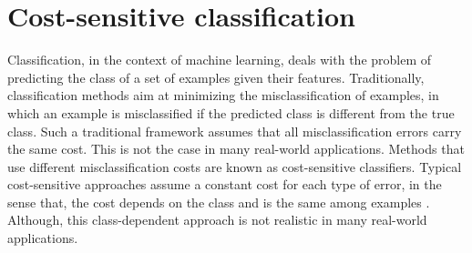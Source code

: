 

\section{Cost-sensitive classification}
\label{sec:2:cs}

  Classification, in the context of machine learning, deals with the problem of predicting the class
  of a set of examples given their features. Traditionally, classification methods aim at 
  minimizing the misclassification of examples, in which an example is misclassified if the 
  predicted class is different from the true class. Such a traditional framework assumes that all 
  misclassification errors carry the same cost. This is not the case in many real-world 
  applications. Methods that use different misclassification costs are known as cost-sensitive 
  classifiers. Typical cost-sensitive approaches assume a constant cost for each type of error, in 
  the sense that, the cost depends on the class and is the same among examples  
  \citep{Elkan2001,Kim2012}. 
  Although, this class-dependent approach is not realistic in many real-world applications.
  
